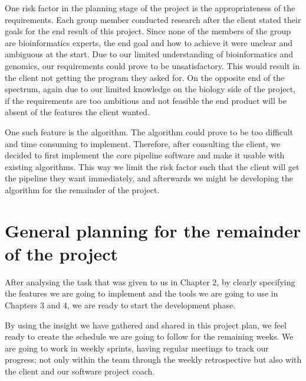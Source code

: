 \documentclass{report}
\begin{document}
One risk factor in the planning stage of the project is the appropriateness of the requirements. Each group member conducted research after the client stated their goals for the end result of this project. Since none of the members of the group are bioinformatics experts, the end goal and how to achieve it were unclear and ambiguous at the start. Due to our limited understanding of bioinformatics and genomics, our requirements could prove to be unsatisfactory. This would result in the client not getting the program they asked for. On the opposite end of the spectrum, again due to our limited knowledge on the biology side of the project, if the requirements are too ambitious and not feasible the end product will be absent of the features the client wanted. 

One such feature is the algorithm. The algorithm could prove to be too difficult and time consuming to implement. Therefore, after consulting the client, we decided to first implement the core pipeline software and make it usable with existing algorithms. This way we limit the risk factor such that the client will get the pipeline they want immediately, and afterwards we might be developing the algorithm for the remainder of the project.


































\chapter{General planning for the remainder of the project}

After analysing the task that was given to us in Chapter 2, by clearly specifying the features we are going to implement and the tools we are going to use in Chapters 3 and 4, we are ready to start the development phase. 
 
By using the insight we have gathered and shared in this project plan, we feel ready to create the schedule we are going to follow for the remaining weeks. We are going to work in weekly sprints, having regular meetings to track our progress; not only within the team through the weekly retrospective but also with the client and our software project coach.
 
\end{document}
